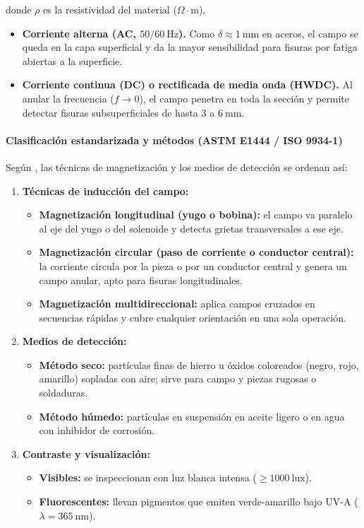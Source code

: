 donde $\rho$ es la resistividad del material ($\Omega\cdot\text{m}$).

\begin{itemize}
  \item \textbf{Corriente alterna (AC, $50/60\ \text{Hz}$).} Como $\delta \approx
        1\ \text{mm}$ en aceros, el campo se queda en la capa superficial y da la
        mayor sensibilidad para fisuras por fatiga abiertas a la superficie.
  \item \textbf{Corriente continua (DC) o rectificada de media onda (HWDC).} Al
        anular la frecuencia ($f\to 0$), el campo penetra en toda la sección y
        permite detectar fisuras subsuperficiales de hasta $3$ a $6\ \text{mm}$.
\end{itemize}

\paragraph{Clasificación estandarizada y métodos (ASTM E1444 / ISO 9934-1)}

Según \parencite{astm_e1444, iso9934_1, asme_bpvc_v}, las técnicas de magnetización
y los medios de detección se ordenan así:

\begin{enumerate}
  \item \textbf{Técnicas de inducción del campo:}
  \begin{itemize}
    \item \textbf{Magnetización longitudinal (yugo o bobina):} el campo va paralelo
          al eje del yugo o del solenoide y detecta grietas transversales a ese eje.
    \item \textbf{Magnetización circular (paso de corriente o conductor central):}
          la corriente circula por la pieza o por un conductor central y genera un
          campo anular, apto para fisuras longitudinales.
    \item \textbf{Magnetización multidireccional:} aplica campos cruzados en
          secuencias rápidas y cubre cualquier orientación en una sola operación.
  \end{itemize}
  \item \textbf{Medios de detección:}
  \begin{itemize}
    \item \textbf{Método seco:} partículas finas de hierro u óxidos coloreados
          (negro, rojo, amarillo) sopladas con aire; sirve para campo y piezas
          rugosas o soldaduras.
    \item \textbf{Método húmedo:} partículas en suspensión en aceite ligero o en
          agua con inhibidor de corrosión.
  \end{itemize}
  \item \textbf{Contraste y visualización:}
  \begin{itemize}
    \item \textbf{Visibles:} se inspeccionan con luz blanca intensa
          ($\ge 1000\ \text{lux}$).
    \item \textbf{Fluorescentes:} llevan pigmentos que emiten verde-amarillo bajo
          UV-A ($\lambda = 365\ \text{nm}$).
  \end{itemize}
\end{enumerate}

